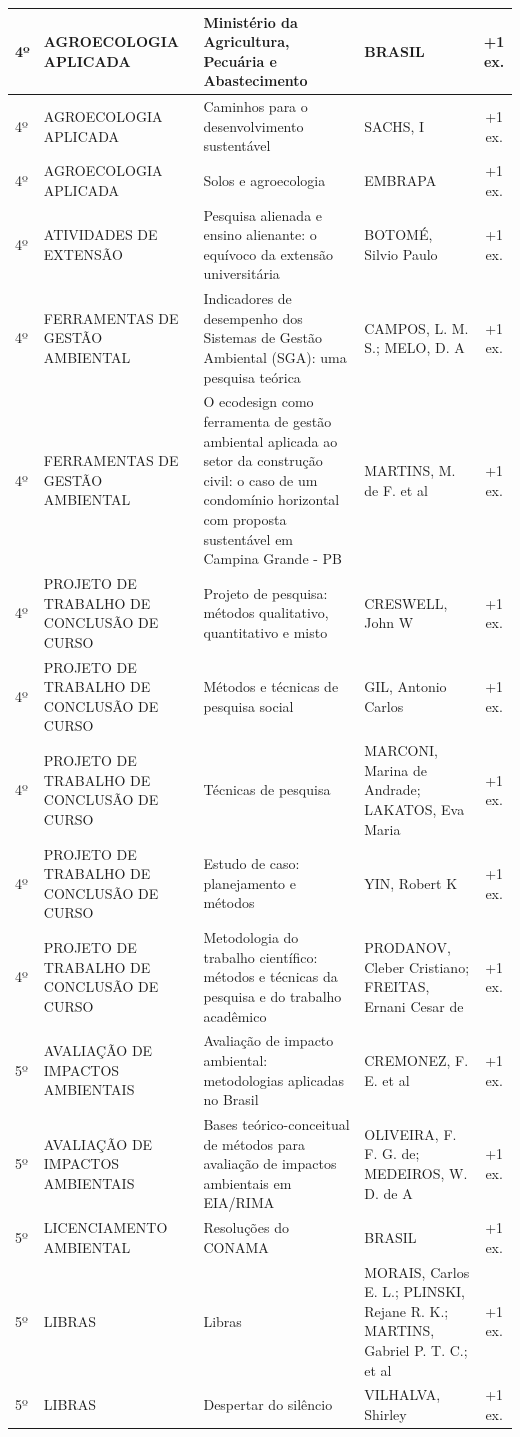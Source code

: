 \documentclass[11pt,a4paper]{article}
\begin{document}
\begin{longtable}{|p{1.2cm}|p{3.5cm}|p{6cm}|p{3.5cm}|c|}
4º & AGROECOLOGIA APLICADA & Ministério da Agricultura, Pecuária e Abastecimento & BRASIL & +1 ex. \\ \hline
4º & AGROECOLOGIA APLICADA & Caminhos para o desenvolvimento sustentável & SACHS, I & +1 ex. \\ \hline
4º & AGROECOLOGIA APLICADA & Solos e agroecologia & EMBRAPA & +1 ex. \\ \hline
4º & ATIVIDADES DE EXTENSÃO & Pesquisa alienada e ensino alienante: o equívoco da extensão universitária & BOTOMÉ, Silvio Paulo & +1 ex. \\ \hline
4º & FERRAMENTAS DE GESTÃO AMBIENTAL & Indicadores de desempenho dos Sistemas de Gestão Ambiental (SGA): uma pesquisa teórica & CAMPOS, L. M. S.; MELO, D. A & +1 ex. \\ \hline
4º & FERRAMENTAS DE GESTÃO AMBIENTAL & O ecodesign como ferramenta de gestão ambiental aplicada ao setor da construção civil: o caso de um condomínio horizontal com proposta sustentável em Campina Grande - PB & MARTINS, M. de F. et al & +1 ex. \\ \hline
4º & PROJETO DE TRABALHO DE CONCLUSÃO DE CURSO & Projeto de pesquisa: métodos qualitativo, quantitativo e misto & CRESWELL, John W & +1 ex. \\ \hline
4º & PROJETO DE TRABALHO DE CONCLUSÃO DE CURSO & Métodos e técnicas de pesquisa social & GIL, Antonio Carlos & +1 ex. \\ \hline
4º & PROJETO DE TRABALHO DE CONCLUSÃO DE CURSO & Técnicas de pesquisa & MARCONI, Marina de Andrade; LAKATOS, Eva Maria & +1 ex. \\ \hline
4º & PROJETO DE TRABALHO DE CONCLUSÃO DE CURSO & Estudo de caso: planejamento e métodos & YIN, Robert K & +1 ex. \\ \hline
4º & PROJETO DE TRABALHO DE CONCLUSÃO DE CURSO & Metodologia do trabalho científico: métodos e técnicas da pesquisa e do trabalho acadêmico & PRODANOV, Cleber Cristiano; FREITAS, Ernani Cesar de & +1 ex. \\ \hline
5º & AVALIAÇÃO DE IMPACTOS AMBIENTAIS & Avaliação de impacto ambiental: metodologias aplicadas no Brasil & CREMONEZ, F. E. et al & +1 ex. \\ \hline
5º & AVALIAÇÃO DE IMPACTOS AMBIENTAIS & Bases teórico-conceitual de métodos para avaliação de impactos ambientais em EIA/RIMA & OLIVEIRA, F. F. G. de; MEDEIROS, W. D. de A & +1 ex. \\ \hline
5º & LICENCIAMENTO AMBIENTAL & Resoluções do CONAMA & BRASIL & +1 ex. \\ \hline
5º & LIBRAS & Libras & MORAIS, Carlos E. L.; PLINSKI, Rejane R. K.; MARTINS, Gabriel P. T. C.; et al & +1 ex. \\ \hline
5º & LIBRAS & Despertar do silêncio & VILHALVA, Shirley & +1 ex. \\ \hline
\end{longtable}
\end{document}

